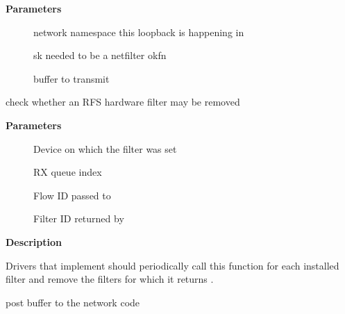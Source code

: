 \documentclass[a4paper,8pt,english]{sphinxmanual}
\begin{document}
\textbf{Parameters}
\begin{description}
\item[{}] \leavevmode
network namespace this loopback is happening in

\item[{}] \leavevmode
sk needed to be a netfilter okfn

\item[{}] \leavevmode
buffer to transmit

\end{description}

\begin{fulllineitems}
\label{networking/kapi:c.rps_may_expire_flow}
check whether an RFS hardware filter may be removed

\end{fulllineitems}


\textbf{Parameters}
\begin{description}
\item[{}] \leavevmode
Device on which the filter was set

\item[{}] \leavevmode
RX queue index

\item[{}] \leavevmode
Flow ID passed to 

\item[{}] \leavevmode
Filter ID returned by 

\end{description}

\textbf{Description}

Drivers that implement  should periodically call
this function for each installed filter and remove the filters for
which it returns .

\begin{fulllineitems}
\label{networking/kapi:c.netif_rx}
post buffer to the network code

\end{fulllineitems}
\end{document}
